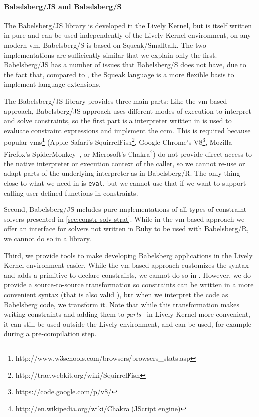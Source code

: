 \paragraph{Babelsberg/JS and Babelsberg/S}
The Babelsberg/JS library is developed in the Lively Kernel, but is itself
written in pure \javascript and can be used independently of the Lively Kernel
environment, on any modern \javascript \ac{vm}. Babelsberg/S is based on
Squeak/Smalltalk. The two implementations are sufficiently similar that we
explain only the first. Babelsberg/JS has a number of issues that Babelsberg/S
does not have, due to the fact that, compared to \javascript, the Squeak
language is a more flexible basis to implement language extensions.

The Babelsberg/JS library provides three main parts: Like the \ac{vm}-based
approach, Babelsberg/JS approach uses different modes of execution to interpret
and solve constraints, so the first part is a \javascript interpreter written in
\javascript is used to evaluate constraint expressions and implement the
\acrlong{ccm}. This is required because popular \javascript
\acp{vm}\footnote{http://www.w3schools.com/browsers/browsers\_stats.asp} (Apple
Safari's SquirrelFish\footnote{http://trac.webkit.org/wiki/SquirrelFish}, Google
Chrome's V8\footnote{https://code.google.com/p/v8/}, Mozilla Firefox's
SpiderMonkey~\cite{gal-tracejit-2009}, or Microsoft's
Chakra\footnote{http://en.wikipedia.org/wiki/Chakra (JScript engine)}) do not
provide direct access to the native interpreter or execution context of the
caller, so we cannot re-use or adapt parts of the underlying interpreter as in
Babelsberg/R. The only thing close to what we need in \javascript is
\lstinline{eval}, but we cannot use that if we want to support calling user
defined functions in constraints.

Second, Babelsberg/JS includes pure \javascript implementations of all types of
constraint solvers presented in \autoref{sec:constr-solv-strat}. While in the
\ac{vm}-based approach we offer an interface for solvers not written in Ruby to
be used with Babelsberg/R, we cannot do so in a \javascript library.

Third, we provide tools to make developing Babelsberg applications in the Lively
Kernel environment easier. While the \ac{vm}-based approach customizes the
syntax and adds a primitive to declare constraints, we cannot do so in
\javascript. However, we do provide a source-to-source transformation so
constraints can be written in a more convenient syntax (that is also valid
\javascript), but when we interpret the code as Babelsberg code, we transform
it. Note that while this transformation makes writing constraints and adding
them to \emph{parts}~\cite{lively-partsbin-2012} in Lively Kernel more
convenient, it can still be used outside the Lively environment, and can be
used, for example during a pre-compilation step.

